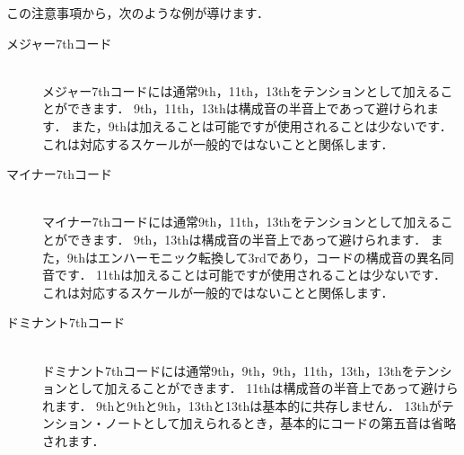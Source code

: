 \documentclass[dvipdfmx,uplatex,b5paper,openany,jbase=12Q,nomag*,textwidth-limit=44%
               ]{gachimuchi}
\begin{document}
この注意事項から，次のような例が導けます．
\begin{description}
  \item[メジャー7thコード] ~\\
  メジャー7thコードには通常9th，\bSharp 11th，13thをテンションとして加えることができます．
  \bFlat 9th，11th，\bFlat 13thは構成音の半音上であって避けられます．
  また，\bSharp 9thは加えることは可能ですが使用されることは少ないです．
  これは対応するスケールが一般的ではないことと関係します．
  \begin{Music}
    \nostartrule%
    \Startpiece
    \Notes%
    \hsk%
    \en%
    \endpiece
  \end{Music}
  \item[マイナー7thコード] ~\\
  マイナー7thコードには通常9th，11th，13thをテンションとして加えることができます．
  \bFlat 9th，\bFlat 13thは構成音の半音上であって避けられます．
  また，\bSharp 9thはエンハーモニック転換して\bFlat 3rdであり，コードの構成音の異名同音です．
  \bSharp 11thは加えることは可能ですが使用されることは少ないです．
  これは対応するスケールが一般的ではないことと関係します．
  \begin{Music}
    \nostartrule%
    \Startpiece
    \Notes%
    \en%
    \endpiece
  \end{Music}
  \item[ドミナント7thコード] ~\\
  ドミナント7thコードには通常\bFlat 9th，9th，\bSharp 9th，\bSharp 11th，\bFlat 13th，13thをテンションとして加えることができます．
  11thは構成音の半音上であって避けられます．
  \bFlat 9thと9thと\bSharp 9th，\bFlat 13thと13thは基本的に共存しません．
  \bFlat 13thがテンション・ノートとして加えられるとき，基本的にコードの第五音は省略されます．
  \begin{Music}
    \nostartrule%
    \Startpiece
    \Notes%

\end{Music}
\end{description}
\end{document}
